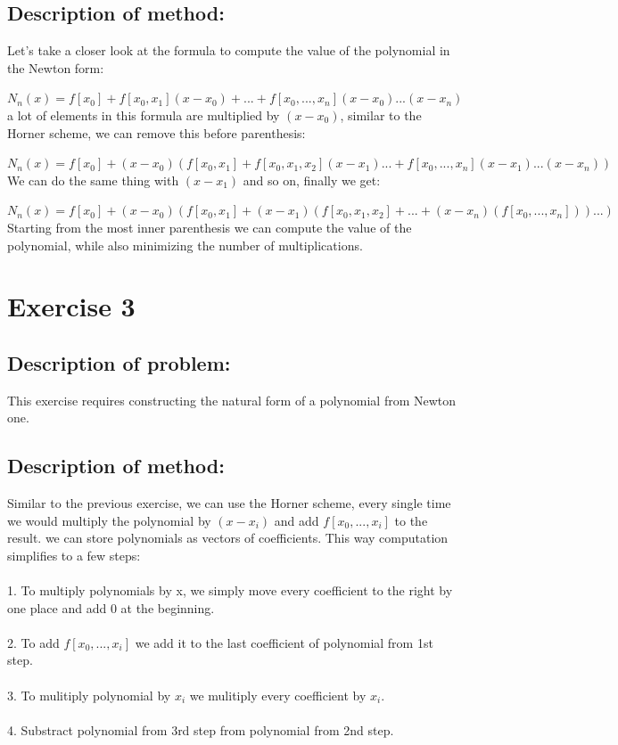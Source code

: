\documentclass{article}
\begin{document}
\subsection*{Description of method:}
Let's take a closer look at the formula to compute the value of the polynomial in the Newton form:

$N_n(x) = f[x_0] + f[x_0, x_1](x - x_0) + ... + f[x_0, ..., x_n](x - x_0)...(x - x_n) $\\
a lot of elements in this formula are multiplied by $(x - x_0)$, similar to the Horner scheme, we can remove this before parenthesis:

$N_n(x) = f[x_0] + (x - x_0)(f[x_0, x_1] + f[x_0, x_1, x_2](x - x_1) ... + f[x_0, ..., x_n](x - x_1)...(x - x_n)) $\\
We can do the same thing with $(x - x_1)$ and so on, finally we get:

$N_n(x) = f[x_0] + (x - x_0)(f[x_0, x_1] + (x - x_1)(f[x_0, x_1, x_2] + ... + (x - x_n)(f[x_0, ..., x_n]))...)$\\
Starting from the most inner parenthesis we can compute the value of the polynomial, while also minimizing the number of multiplications.

\section*{Exercise 3}

\subsection*{Description of problem:}
This exercise requires constructing the natural form of a polynomial from Newton one.

\subsection*{Description of method:}
Similar to the previous exercise, we can use the Horner scheme, every single time we would multiply the polynomial by $(x - x_i)$ and add $f[x_0, ..., x_i]$ to the result. we can store polynomials as vectors of coefficients. This way computation simplifies to a few steps:\\
\\
1. To multiply polynomials by x, we simply move every coefficient to the right by one place and add 0 at the beginning.\\
\\
2. To add $f[x_0, ..., x_i]$ we add it to the last coefficient of polynomial from 1st step.\\
\\
3. To mulitiply polynomial by $x_i$ we mulitiply every coefficient by $x_i$.\\
\\
4. Substract polynomial from 3rd step from polynomial from 2nd step.
\end{document}

